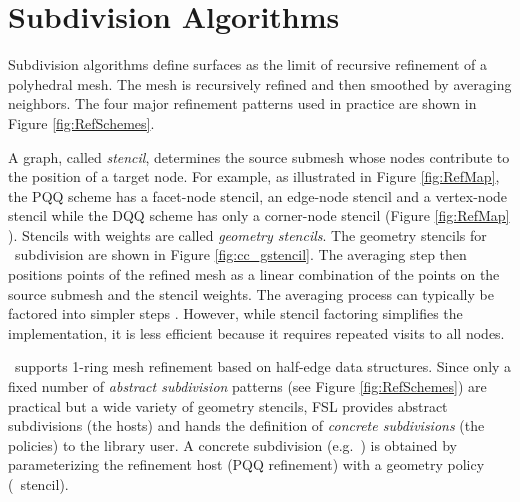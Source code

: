  



\section{Subdivision Algorithms}
Subdivision algorithms define surfaces as the limit
of recursive refinement of a polyhedral mesh. 
The mesh is recursively refined and then 
smoothed by averaging neighbors.
The four major refinement patterns used in practice
are shown in Figure \ref{fig:RefSchemes}.

A graph, called \emph{stencil}, determines the source submesh 
whose nodes contribute to the position of a target node.
For example, as illustrated in Figure \ref{fig:RefMap},
the PQQ scheme has a facet-node stencil,
an edge-node stencil and a vertex-node stencil 
while the DQQ scheme has only a corner-node stencil
(Figure \ref{fig:RefMap} \IR).
Stencils with weights are called \emph{geometry stencils}.
The geometry stencils for \CC\ subdivision are
shown in Figure \ref{fig:cc_gstencil}. The 
averaging step then positions points of the
refined mesh as a linear combination
of the points on the source submesh and the stencil weights.   
The averaging process can typically be factored into 
simpler steps \cite{Oswald-2003-CSS}.
However, while stencil factoring simplifies the implementation,
it is less efficient because it requires repeated visits 
to all nodes.

\ supports 1-ring mesh refinement based on 
half-edge data structures.
Since only a fixed number of \emph{abstract subdivision}
patterns (see Figure \ref{fig:RefSchemes}) are practical
but a wide variety of geometry stencils,
FSL provides abstract subdivisions (the hosts)
and hands the definition of \emph{concrete subdivisions}
(the policies) to the library user. A concrete 
subdivision (e.g.~\CC) is obtained by 
parameterizing the refinement host (PQQ refinement) 
with a geometry policy (\CC\ stencil).

